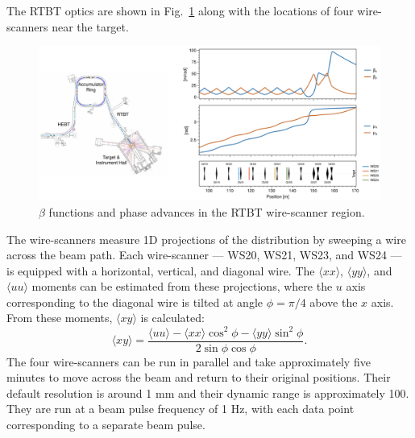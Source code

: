 The RTBT optics are shown in Fig.~\ref{fig:rtbt_optics} along with the locations of four wire-scanners near the target.
%
\begin{figure}[!p]
    \includegraphics[width=\textwidth]{Images/chapter4/RTBT_optics4.png}
    \caption{$\beta$ functions and phase advances in the RTBT wire-scanner region.}
    \label{fig:rtbt_optics}
\end{figure}
%
The wire-scanners measure 1D projections of the distribution by sweeping a wire across the beam path. Each wire-scanner — WS20, WS21, WS23, and WS24 — is equipped with a horizontal, vertical, and diagonal wire. The $\langle{xx}\rangle$, $\langle{yy}\rangle$, and $\langle{uu}\rangle$ moments can be estimated from these projections, where the $u$ axis corresponding to the diagonal wire is tilted at angle $\phi = \pi/4$ above the $x$ axis. From these moments, $\langle{xy}\rangle$ is calculated:
%
\begin{equation}
    \langle{xy}\rangle = \frac{\langle{uu}\rangle - \langle{xx}\rangle \cos^2\phi - \langle{yy}\rangle \sin^2\phi}{2\sin\phi\cos\phi}
    .
\end{equation}
%
The four wire-scanners can be run in parallel and take approximately five minutes to move across the beam and return to their original positions. Their default resolution is around 1 mm and their dynamic range is approximately 100. They are run at a beam pulse frequency of 1 Hz, with each data point corresponding to a separate beam pulse. 


